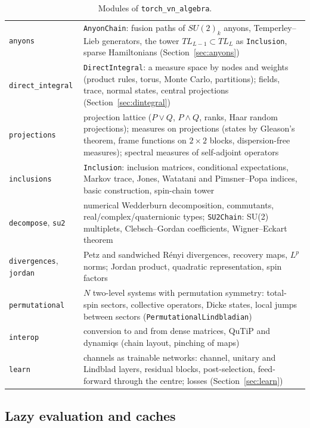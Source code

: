 \documentclass[11pt]{article}
\begin{document}
\begin{table}[t]
\begin{tabular}{lp{}}
\texttt{anyons} & \texttt{AnyonChain}: fusion paths of $SU(2)_k$ anyons, Temperley--Lieb generators, the tower
$TL_{L-1}\subset TL_L$ as \texttt{Inclusion}, sparse Hamiltonians (Section~\ref{sec:anyons})\\
\texttt{direct\_integral} & \texttt{DirectIntegral}: a measure space by nodes and weights (product rules, torus,
Monte Carlo, partitions); fields, trace, normal states, central projections (Section~\ref{sec:dintegral})\\
\texttt{projections} & projection lattice ($P\vee Q$, $P\wedge Q$, ranks, Haar random projections); measures on
projections (states by Gleason's theorem, frame functions on $2\times2$ blocks, dispersion-free measures);
spectral measures of self-adjoint operators\\
\texttt{inclusions} & \texttt{Inclusion}: inclusion matrices, conditional expectations, Markov trace, Jones,
Watatani and Pimsner--Popa indices, basic construction, spin-chain tower\\
\texttt{decompose}, \texttt{su2} & numerical Wedderburn decomposition, commutants, real/complex/quaternionic types;
\texttt{SU2Chain}: SU(2) multiplets, Clebsch--Gordan coefficients, Wigner--Eckart theorem\\
\texttt{divergences}, \texttt{jordan} & Petz and sandwiched Rényi divergences, recovery maps, $L^p$ norms; Jordan
product, quadratic representation, spin factors\\
\texttt{permutational} & $N$ two-level systems with permutation symmetry: total-spin sectors, collective operators,
Dicke states, local jumps between sectors (\texttt{PermutationalLindbladian})\\
\texttt{interop} & conversion to and from dense matrices, QuTiP and dynamiqs (chain layout, pinching of maps)\\
\texttt{learn} & channels as trainable networks: channel, unitary and Lindblad layers, residual blocks, post-selection,
feed-forward through the centre; losses (Section~\ref{sec:learn})\\
\bottomrule
\end{tabular}
\caption{Modules of \texttt{torch\_vn\_algebra}.}
\label{tab:modules}
\end{table}

\subsection{Lazy evaluation and caches}\label{sec:lazy}
\end{document}
